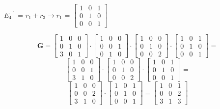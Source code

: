 \documentclass[12pt]{article}
\begin{document}
{\textbf{$E_4^{-1}$} = $r_1 + r_3 \rightarrow r_1 $ = 
$\begin{bmatrix}
1 & 0 & 1 \\
0 & 1 & 0 \\
0 & 0 & 1
\end{bmatrix}$


$$\textbf{G} = 
\begin{bmatrix}
1 & 0 & 0 \\
0 & 1 & 0 \\
3 & 0 & 1
\end{bmatrix} \cdot
\begin{bmatrix}
1 & 0 & 0 \\
0 & 0 & 1 \\
0 & 1 & 0
\end{bmatrix} \cdot
\begin{bmatrix}
1 & 0 & 0 \\
0 & 1 & 0 \\
0 & 0 & 2
\end{bmatrix} \cdot 
\begin{bmatrix}
1 & 0 & 1 \\
0 & 1 & 0 \\
0 & 0 & 1
\end{bmatrix} = 
$$
$$
\begin{bmatrix}
1 & 0 & 0 \\
0 & 0 & 1 \\
3 & 1 & 0
\end{bmatrix}\cdot
\begin{bmatrix}
1 & 0 & 0 \\
0 & 1 & 0 \\
0 & 0 & 2
\end{bmatrix} \cdot 
\begin{bmatrix}
1 & 0 & 1 \\
0 & 1 & 0 \\
0 & 0 & 1
\end{bmatrix} = 
$$
$$
\begin{bmatrix}
1 & 0 & 0 \\
0 & 0 & 2 \\
3 & 1 & 0
\end{bmatrix} \cdot 
\begin{bmatrix}
1 & 0 & 1 \\
0 & 1 & 0 \\
0 & 0 & 1
\end{bmatrix} = 
\begin{bmatrix}
1 & 0 & 1 \\
0 & 0 & 2\\
3 & 1 & 3
\end{bmatrix}
$$\\

}
\end{document}
